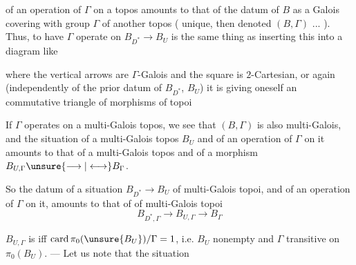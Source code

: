 
 of an operation of $\Gamma$ on a topos  amounts
to that of the datum of $B$ as a
Galois covering with group $\Gamma$ of
another topos ( unique, then denoted
$(B,\Gamma)$ ... ). Thus, to have
 $\Gamma$ operate on $B_{D^*}\longrightarrow B_U$ is
the same thing as inserting this
  into a diagram like


 where the vertical arrows are $\Gamma$-Galois
and the square is $2$-Cartesian, or again
(independently of the prior datum
of $B_{D^*}$, $B_U$) it is giving oneself an
 commutative triangle of morphisms
of topoi



If $\Gamma$ operates on a multi-Galois topos,
we see that $(B,\Gamma)$ is also
multi-Galois, and the situation of a
multi-Galois topos $B_U$ and of an
operation of $\Gamma$ on it amounts to that
of a multi-Galois topos  and of
a morphism $B_{U,\Gamma}\unsure{\longrightarrow|\longleftrightarrow}B_\Gamma$.

So the datum of a situation
$B_{D^*}\longrightarrow B_U$ of multi-Galois topoi,
and of an operation of $\Gamma$ on it,
amounts  to that of 
of multi-Galois topoi
\[
 B_{D^*,\Gamma}\longrightarrow B_{U,\Gamma}\longrightarrow B_\Gamma
\]

$B_{U,\Gamma}$ is  iff $\operatorname{card}\pi_0(\unsure{B_U})/\Gamma=1$,
i.e. $B_U$ nonempty and $\Gamma$ transitive on
$\pi_0(B_U)$. --- Let us note that the situation

